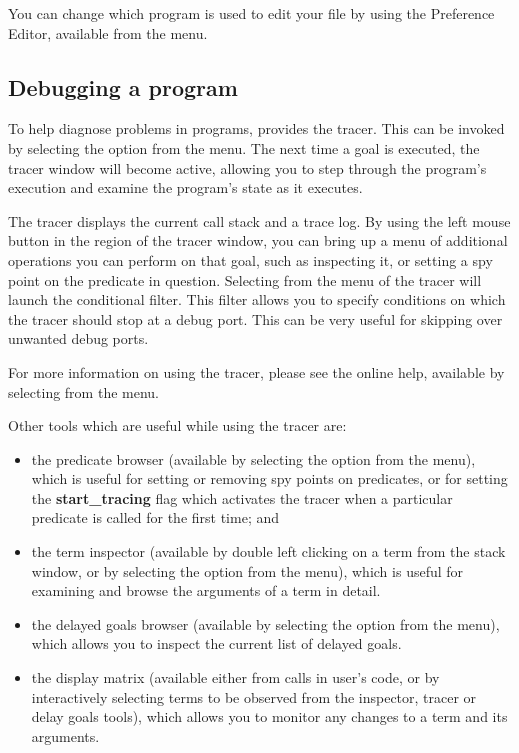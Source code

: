 You can change which program is used to edit your file by using the
{\tkeclipse} Preference Editor, available from the  menu.

\subsection{Debugging a program}
\label{secdebug}

To help diagnose problems in {\eclipse} programs, {\tkeclipse} provides the
tracer.
This can be invoked by selecting the  option from the
 menu.
The next time a goal is executed, the tracer window will become active,
allowing you to step through the program's execution and examine the
program's state as it executes.

The tracer displays the current call stack and a trace log.
By using the left mouse button in the  region of the
tracer window, you can bring up a menu of additional operations you can
perform on that goal, such as inspecting it, or setting a spy point on the
predicate in question.
Selecting  from the  menu
of the tracer will launch the conditional filter.
This filter allows you to 
specify conditions on which the tracer should stop at a debug port. This
can be very useful for skipping over unwanted debug ports.

For more information on using the tracer, please see the online help,
available by selecting  from the  menu.

Other {\tkeclipse} tools which are useful while using the tracer are:

\begin{itemize}

\item the predicate browser (available by selecting the  option from the  menu), which is useful for setting
or removing spy points on predicates, or for setting the {\bf start_tracing}
flag which activates the tracer when a particular predicate is called for
the first time; and

\item the term inspector (available by double left clicking on a term from
the stack window, or by selecting the 
option from the  menu), which is useful for examining and
browse the arguments of a term in detail. 

\item the delayed goals browser (available by selecting the  option from the  menu), which allows you to inspect
the current list of delayed goals.

\item the display matrix (available either from calls in user's code, or by
interactively selecting terms to be observed from the inspector, tracer or
delay goals tools), which allows you to monitor any changes to a term and
its arguments.

\end{itemize}

